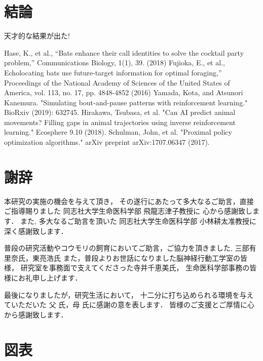 \documentclass[upLatex]{jsreport}
\begin{document}
\newpage
\chapter{結論}
天才的な結果が出た!

\begin{thebibliography}{99}
    Hase, K., et al., “Bats enhance their call identities to solve the cocktail party problem,” Communications Biology, 1(1), 39. (2018)
    Fujioka, E., et al., Echolocating bats use future-target information for optimal foraging,” Proceedings of the National Academy of Sciences of the United States of America, vol. 113, no. 17, pp. 4848-4852 (2016)
    Yamada, Kota, and Atsunori Kanemura. "Simulating bout-and-pause patterns with reinforcement learning." BioRxiv (2019): 632745.
    Hirakawa, Tsubasa, et al. "Can AI predict animal movements? Filling gaps in animal trajectories using inverse reinforcement learning." Ecosphere 9.10 (2018).
    Schulman, John, et al. "Proximal policy optimization algorithms." arXiv preprint arXiv:1707.06347 (2017).
\end{thebibliography}

\chapter*{謝辞}
\label{sec:謝辞}
本研究の実施の機会を与えて頂き，
その遂行にあたって多大なるご助言，直接ご指導賜りました
同志社大学生命医科学部 飛龍志津子教授に
心から感謝致します．
また, 多大なるご助言を頂いた
同志社大学生命医科学部 小林耕太准教授に深く感謝致します．

普段の研究活動やコウモリの飼育においてご助言，ご協力を頂きました,
三部有里奈氏，東亮浩氏
また，普段よりお世話になりました脳神経行動工学室の皆様，
研究室を事務面で支えてくださった寺井千恵美氏，
生命医科学部事務の皆様にお礼申し上げます．

最後になりましたが，研究生活において，
十二分に打ち込められる環境を与えていただいた
父 氏，母 氏に感謝の意を表します．
皆様のご支援とご厚情に心から感謝致します．

\newpage
\chapter*{図表}


\renewcommand{\figurename}{Fig. } %
\renewcommand{\tablename}{Table } %
\end{document}

